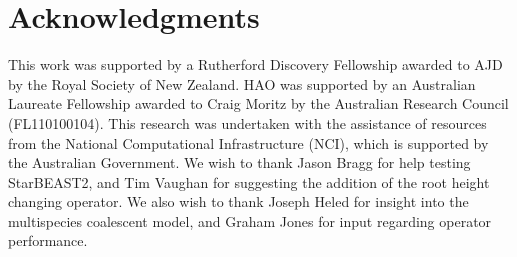 \documentclass[12pt]{article}
\begin{document}
\section{Acknowledgments}

This work was supported by a Rutherford Discovery Fellowship awarded to AJD by
the Royal Society of New Zealand. HAO was supported by an Australian Laureate
Fellowship awarded to Craig Moritz by the Australian Research Council
(FL110100104). This research was undertaken with the assistance of resources
from the National Computational Infrastructure (NCI), which is supported by the
Australian Government. We wish to thank Jason Bragg for help testing StarBEAST2,
and Tim Vaughan for suggesting the addition of the root height changing
operator. We also wish to thank Joseph Heled for insight into the multispecies
coalescent model, and Graham Jones for input regarding operator performance.



\end{document}
